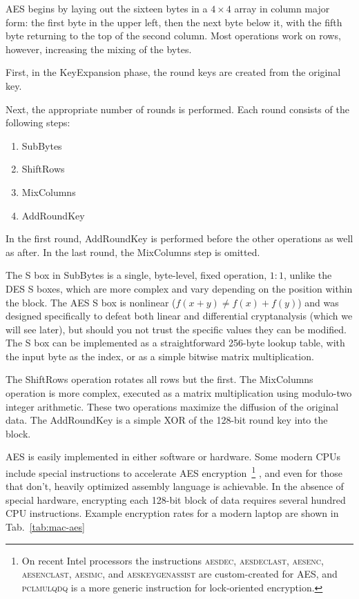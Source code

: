 \documentclass[%
 aip,
 jmp,%
 amsmath,amssymb,
 reprint,%
]{revtex4-1}
\begin{document}
AES begins by laying out the sixteen bytes in a $4\times 4$ array in
column major form: the first byte in the upper left, then the next
byte below it, with the fifth byte returning to the top of the second
column. Most operations work on rows, however, increasing the mixing
of the bytes.

First, in the KeyExpansion phase, the round keys are created from the original key.

Next, the appropriate number of rounds is performed. Each round consists of the following steps:

\begin{enumerate}
\item SubBytes
\item ShiftRows
\item MixColumns
\item AddRoundKey
\end{enumerate}

In the first round, AddRoundKey is performed before the other operations as well as after. In the last round, the MixColumns step is omitted.

The S box in SubBytes is a single, byte-level, fixed operation, $1:1$, unlike the DES S boxes, which are more complex and vary depending on the position within the block. The AES S box is nonlinear ($f(x+y) \ne f(x)+f(y)$) and was designed specifically to defeat both linear and differential cryptanalysis (which we will see later), but should you not trust the specific values they can be modified. The S box can be implemented as a straightforward 256-byte lookup table, with the input byte as the index, or as a simple bitwise matrix multiplication.

The ShiftRows operation rotates all rows but the first. The MixColumns operation is more complex, executed as a matrix multiplication using modulo-two integer arithmetic. These two operations maximize the diffusion of the original data. The AddRoundKey is a simple XOR of the 128-bit round key into the block.

AES is easily implemented in either software or hardware. Some modern
CPUs include special instructions to accelerate AES
encryption~\footnote{On recent Intel processors the instructions
  \textsc{aesdec}, \textsc{aesdeclast}, \textsc{aesenc},
  \textsc{aesenclast}, \textsc{aesimc}, and \textsc{aeskeygenassist}
  are custom-created for AES, and \textsc{pclmulqdq} is a more generic
  instruction for lock-oriented encryption.} , and even for those that
don't, heavily optimized assembly language is achievable.  In the
absence of special hardware, encrypting each 128-bit block of data
requires several hundred CPU instructions. Example encryption rates
for a modern laptop are shown in Tab.~\ref{tab:mac-aes}
\end{document}
